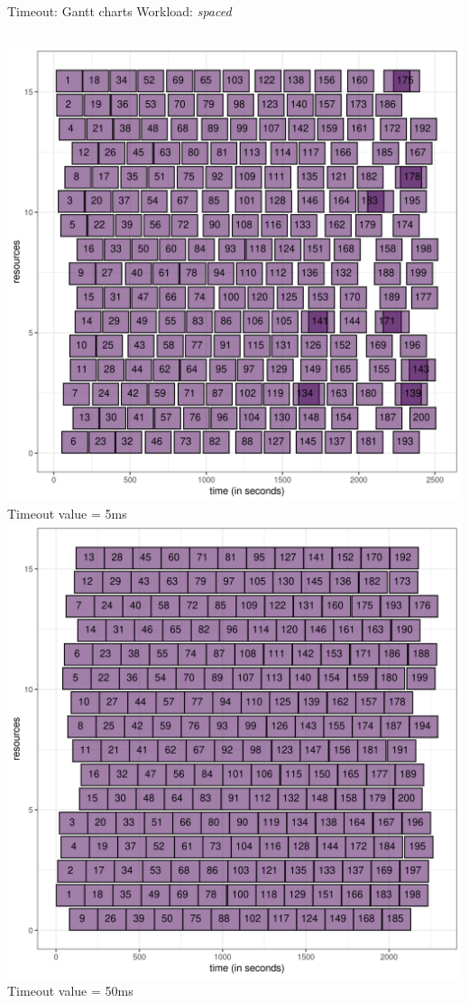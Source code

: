 \documentclass[12pt, aspectratio=43]{beamer}
\begin{document}
\begin{frame}{Timeout: Gantt charts}
	Workload: \textit{spaced}
	\begin{columns}
		\centering
		\includegraphics[width=\textwidth]{../imgs/timeout_5ms_gantt.png}
		\small{Timeout value = 5ms}
		\centering
		\includegraphics[width=\textwidth]{../imgs/timeout_50ms_gantt.png}
		\small{Timeout value = 50ms}
	\end{columns}
\end{frame}
\end{document}
